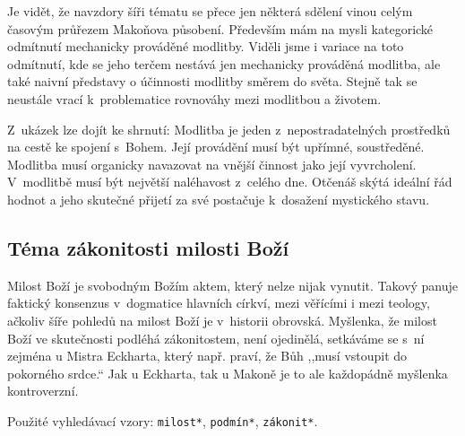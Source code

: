 Je vidět, že navzdory šíři tématu se přece jen některá sdělení vinou celým
časovým průřezem Makoňova působení. Především mám na mysli kategorické odmítnutí
mechanicky prováděné modlitby. Viděli jsme i variace na toto odmítnutí, kde se
jeho terčem nestává jen mechanicky prováděná modlitba, ale také naivní představy
o účinnosti modlitby směrem do světa. Stejně tak se neustále vrací k~problematice
rovnováhy mezi modlitbou a životem.

Z~ukázek lze dojít ke shrnutí: Modlitba je jeden z~nepostradatelných prostředků
na cestě ke spojení s~Bohem. Její provádění musí být upřímné, soustředěné.
Modlitba musí organicky navazovat na vnější činnost jako její vyvrcholení.
V~modlitbě musí být největší naléhavost z~celého dne. Otčenáš skýtá ideální řád
hodnot a jeho skutečné přijetí za své postačuje k~dosažení mystického stavu.

\subsection{Téma zákonitosti milosti Boží}

Milost Boží je svobodným Božím aktem, který nelze nijak vynutit. Takový panuje
faktický konsenzus v~dogmatice hlavních církví, mezi věřícími i mezi teology,
ačkoliv šíře pohledů na milost Boží je v~historii
obrovská\cite{pinnock1989grace}\cite{studer1997grace}\cite{grace1965luther}.
Myšlenka, že milost Boží ve skutečnosti podléhá zákonitostem, není ojedinělá,
setkáváme se s~ní zejména u Mistra Eckharta\cite{landauer1978eckhart}, který
např. praví, že Bůh ,,musí vstoupit do pokorného srdce.`` Jak u Eckharta, tak u
Makoně je to ale každopádně myšlenka kontroverzní.

Použité vyhledávací vzory:
\texttt{milost*},
\texttt{podmín*},
\texttt{zákonit*}.

